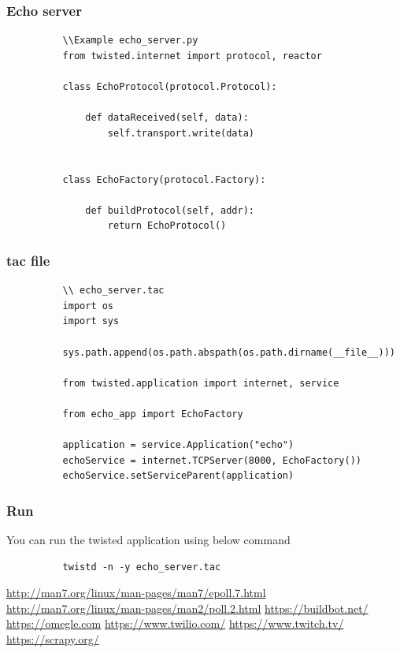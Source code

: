 \documentclass{article}
\begin{document}
      \subsubsection{Echo server}
        \begin{verbatim}
          \\Example echo_server.py
          from twisted.internet import protocol, reactor

          class EchoProtocol(protocol.Protocol):

              def dataReceived(self, data):
                  self.transport.write(data)


          class EchoFactory(protocol.Factory):

              def buildProtocol(self, addr):
                  return EchoProtocol()
        \end{verbatim}

      \subsubsection{tac file}
        \begin{verbatim}
          \\ echo_server.tac
          import os
          import sys

          sys.path.append(os.path.abspath(os.path.dirname(__file__)))

          from twisted.application import internet, service

          from echo_app import EchoFactory

          application = service.Application("echo")
          echoService = internet.TCPServer(8000, EchoFactory())
          echoService.setServiceParent(application)
        \end{verbatim}

      \subsubsection{Run}
        You can run the twisted application using below command

        \begin{verbatim}
          twistd -n -y echo_server.tac
        \end{verbatim}


  \begin{thebibliography}{2}
      \url{http://man7.org/linux/man-pages/man7/epoll.7.html}%
      \url{http://man7.org/linux/man-pages/man2/poll.2.html}%
      \url{https://buildbot.net/}%
      \url{https://omegle.com}%
      \url{https://www.twilio.com/}%
      \url{https://www.twitch.tv/}%
      \url{https://scrapy.org/}%
  \end{thebibliography}
\end{document}
